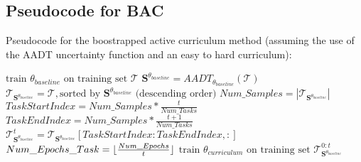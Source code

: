 \subsection{Pseudocode for BAC}\label{BACPseudocode}
Pseudocode for the boostrapped active curriculum method (assuming the use of the AADT uncertainty function and an easy to hard curriculum):
\begin{algorithmic}
\STATE $\text{train }  \theta_{baseline} \text{ on training set } \mathcal{T}$
\ENDFOR
\STATE $\mathbf{S}^{\theta_{baseline}} = AADT_{\theta_{baseline}}(\mathcal{T})$
\STATE $\mathcal{T}_{\mathbf{S}^{\theta_{baseline}}} = \mathcal{T}, \text{sorted by } \mathbf{S}^{\theta_{baseline}} \text{ (descending order)}$ 
\STATE $Num\_Samples = |\mathcal{T}_{\mathbf{S}^{\theta_{baseline}}}|$
\STATE $TaskStartIndex = Num\_Samples*\frac{t}{Num\_Tasks} $
\STATE $TaskEndIndex = Num\_Samples*\frac{t+1}{Num\_Tasks} $
\STATE $\mathcal{T}^{t}_{\mathbf{S}^{\theta_{baseline}}} = \mathcal{T}_{\mathbf{S}^{\theta_{baseline}}}[TaskStartIndex:TaskEndIndex,:] $
\ENDFOR
{}
\STATE $Num\_Epochs\_Task = \lfloor\frac{Num\_Epochs}{t}\rfloor$
\STATE $\text{train }  \theta_{curriculum} \text{ on training set } \mathcal{T}^{0:t}_{\mathbf{S}^{\theta_{baseline}}} $
\ENDFOR
\ENDFOR
\end{algorithmic}

